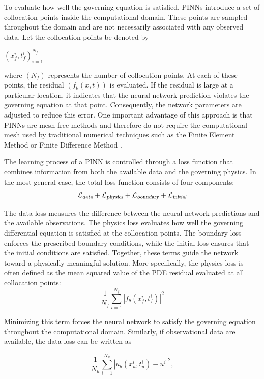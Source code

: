 \documentclass[11pt]{article}
\begin{document}
To evaluate how well the governing equation is satisfied, 
PINNs introduce a set of collocation points inside the computational domain. 
These points are sampled throughout the domain and are not necessarily 
associated with any observed data. Let the collocation points be denoted by

${(x_f^i,t_f^i)}_{i=1}^{N_f}$

where $(N_f)$ represents the number of collocation points. 
At each of these points, the residual $(f_\theta(x,t))$ is evaluated. If the residual is large at a particular location, it indicates that the neural network 
prediction violates the governing 
equation at that point. Consequently, the network parameters are 
adjusted to reduce this error. One important advantage of this approach is 
that PINNs are mesh-free methods and therefore do not require the computational mesh used by traditional 
numerical techniques such as the Finite Element Method or Finite Difference Method\cite{raissiPhysicsinformedNeuralNetworks2019} \cite{cuomoScientificMachineLearning2022}.


The learning process of a PINN is controlled through a loss function that combines 
information from both the available data and the governing physics. 
In the most general case, the total loss function consists of four components:
$$
\mathcal{L_{\textsl{data}}}
+
\mathcal{L_{\textsl{physics}}}
+
\mathcal{L_{\textsl{boundary}}}
+
\mathcal{L_{\textsl{initial}}}
$$

The data loss measures the difference between the neural network 
predictions and the available observations. The physics loss 
evaluates how well the governing differential equation is 
satisfied at the collocation points. The boundary loss enforces 
the prescribed boundary conditions, while the initial loss 
ensures that the initial conditions are satisfied. Together, 
these terms guide the network toward a physically meaningful solution.
More specifically, the physics loss is often defined as the mean squared value of 
the PDE residual evaluated at all collocation points:
\begin{equation}
\frac{1}{N_f}
\sum_{i=1}^{N_f}
\left|
f_\theta(x_f^i,t_f^i)
\right|^2
\end{equation}


Minimizing this term forces the neural network to satisfy the 
governing equation throughout the computational domain. Similarly, 
if observational data are available, the data loss can be written as


\begin{equation}
\frac{1}{N_u}
\sum_{i=1}^{N_u}
\left|
u_\theta(x_u^i,t_u^i)-u^i
\right|^2,
\end{equation}
\end{document}
